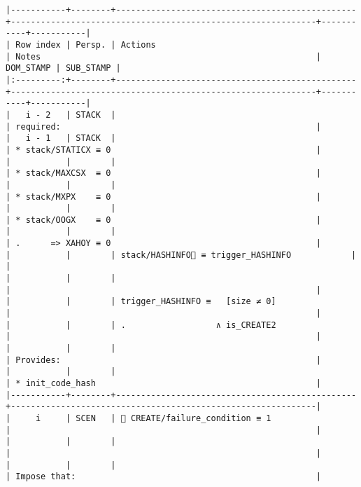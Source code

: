 \documentclass[varwidth=\maxdimen,margin=0.5cm,multi={verbatim}]{standalone}
\begin{document}
\begin{verbatim}
|-----------+--------+------------------------------------------------+-------------------------------------------------------------+-----------+-----------|
| Row index | Persp. | Actions                                        | Notes                                                       | DOM_STAMP | SUB_STAMP |
|:---------:+--------+------------------------------------------------+-------------------------------------------------------------+-----------+-----------|
|   i - 2   | STACK  |                                                | required:                                                   |
|   i - 1   | STACK  |                                                | * stack/STATICX ≡ 0                                         |
|           |        |                                                | * stack/MAXCSX  ≡ 0                                         |
|           |        |                                                | * stack/MXPX    ≡ 0                                         |
|           |        |                                                | * stack/OOGX    ≡ 0                                         |
|           |        |                                                | .      => XAHOY ≡ 0                                         |
|           |        | stack/HASHINFO🚩 ≡ trigger_HASHINFO            |                                                             |
|           |        |                                                |                                                             |
|           |        | trigger_HASHINFO ≡   [size ≠ 0]                |                                                             |
|           |        | .                  ∧ is_CREATE2                |                                                             |
|           |        |                                                | Provides:                                                   |
|           |        |                                                | * init_code_hash                                            |
|-----------+--------+------------------------------------------------+-------------------------------------------------------------|
|     i     | SCEN   |  CREATE/failure_condition ≡ 1                 |                                                             |
|           |        |                                                |                                                             |
|           |        |                                                | Impose that:                                                |

\end{verbatim}
\end{document}
